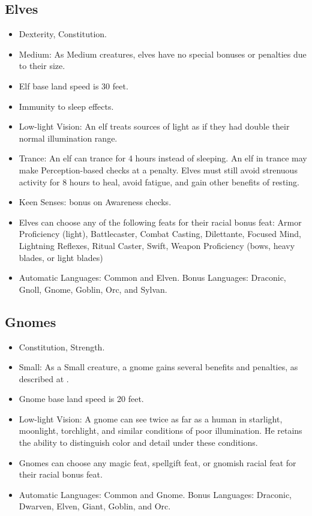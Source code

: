 \subsection{Elves}
\begin{itemize}
\item {} Dexterity,  Constitution.
\item Medium: As Medium creatures, elves have no special bonuses or penalties due to their size.
\item Elf base land speed is 30 feet.
\item Immunity to sleep effects.
\item Low-light Vision: An elf treats sources of light as if they had double their normal illumination range.
 \item Trance: An elf can trance for 4 hours instead of sleeping. An elf in trance may make Perception-based checks at a  penalty. Elves must still avoid strenuous activity for 8 hours to heal, avoid fatigue, and gain other benefits of resting.
\item Keen Senses:  bonus on Awareness checks.
\item Elves can choose any of the following feats for their racial bonus feat: Armor Proficiency (light), Battlecaster, Combat Casting, Dilettante, Focused Mind, Lightning Reflexes, Ritual Caster, Swift, Weapon Proficiency (bows, heavy blades, or light blades)
\item Automatic Languages: Common and Elven. Bonus Languages: Draconic, Gnoll, Gnome, Goblin, Orc, and Sylvan.
\end{itemize}

\subsection{Gnomes}
\begin{itemize}
\item {} Constitution,  Strength.
\item Small: As a Small creature, a gnome gains several benefits and penalties, as described at .
\item Gnome base land speed is 20 feet.
\item Low-light Vision: A gnome can see twice as far as a human in starlight, moonlight, torchlight, and similar conditions of poor illumination. He retains the ability to distinguish color and detail under these conditions.

\item Gnomes can choose any magic feat, spellgift feat, or gnomish racial feat for their racial bonus feat.
\item Automatic Languages: Common and Gnome. Bonus Languages: Draconic, Dwarven, Elven, Giant, Goblin, and Orc.
\end{itemize}

